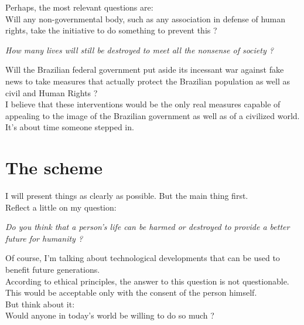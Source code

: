 \documentclass[11pt]{book}
\begin{document}
\noindent Perhaps, the most relevant questions are: \\

\noindent Will any non-governmental body, such as any association in defense of human rights, take the initiative to do something to prevent this ?

\noindent \begin{center} \emph{How many lives will still be destroyed to meet all the nonsense of society ?} \end{center}

\noindent  Will the Brazilian federal government put aside its incessant war against fake news to take measures that actually protect the Brazilian population as well as civil and Human Rights ? \\

\noindent  I believe that these interventions would be the only real measures capable of appealing to the image of the Brazilian government as well as of a civilized world. \\

\noindent  It's about time someone stepped in.

\chapter{The scheme}

\noindent I will present things as clearly as possible. But the main thing first. \\ 

\noindent Reflect a little on my question:

\noindent \begin{center} \emph{Do you think that a person's life can be harmed or destroyed to provide a better future for humanity ?} \end{center}

\noindent Of course, I'm talking about technological developments that can be used to benefit future generations. \\

\noindent According to ethical principles, the answer to this question is not questionable. This would be acceptable only with the consent of the person himself. \\

\noindent But think about it: \\

\noindent Would anyone in today's world be willing to do so much ? \\ 
\end{document}
